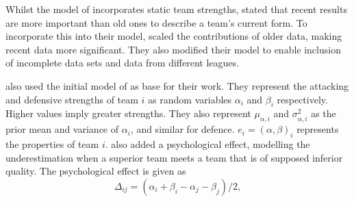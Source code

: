 Whilst the model of \citet{bib:maher-1982} incorporates static team strengths, \citet{bib:dixon-coles-1997} stated that recent results are more important than old ones to describe a team's current form. To incorporate this into their model, \citet{bib:dixon-coles-1997} scaled the contributions of older data, making recent data more significant. They also modified their model to enable inclusion of incomplete data sets and data from different leagues.

\citet{bib:rue-salvesen-2000} also used the initial model of \citeauthor{bib:maher-1982} as base for their work. They represent the attacking and defensive strengths of team $i$ as random variables $\alpha_{i}$ and $\beta_{i}$ respectively. Higher values imply greater strengths. They also represent $\mu_{\alpha, i}$ and $\sigma^2_{\alpha, i}$ as the prior mean and variance of $\alpha_{i}$, and similar for defence. $e_{i} = (\alpha, \beta)_{i}$ represents the properties of team $i$. \citet{bib:rue-salvesen-2000} also added a psychological effect, modelling the underestimation when a superior team meets a team that is of supposed inferior quality. The psychological effect is given as
\begin{equation*}
    \Delta_{ij} = (\alpha_{i} + \beta_{i} - \alpha_{j} - \beta_{j}) / 2,
\end{equation*}
